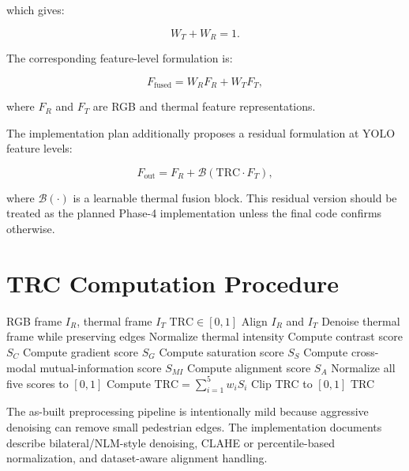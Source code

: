 \documentclass[conference]{IEEEtran}
\begin{document}
which gives:

\begin{equation}
W_T+W_R=1.
\label{eq:weightconstraint}
\end{equation}

The corresponding feature-level formulation is:

\begin{equation}
F_{\mathrm{fused}}
=
W_RF_R+W_TF_T,
\label{eq:fusion}
\end{equation}

where $F_R$ and $F_T$ are RGB and thermal feature representations.

The implementation plan additionally proposes a residual formulation at YOLO feature levels:

\begin{equation}
F_{\mathrm{out}}
=
F_R+\mathcal{B}\left(\mathrm{TRC}\cdot F_T\right),
\label{eq:residual}
\end{equation}

where $\mathcal{B}(\cdot)$ is a learnable thermal fusion block. This residual version should be treated as the planned Phase-4 implementation unless the final code confirms otherwise.


\section{TRC Computation Procedure}

\begin{algorithm}[!t]
\caption{Thermal Reliability Coefficient Computation}
\label{alg:trc}
\begin{algorithmic}[1]
\Require RGB frame $I_R$, thermal frame $I_T$
\Ensure $\mathrm{TRC}\in[0,1]$
\State Align $I_R$ and $I_T$
\State Denoise thermal frame while preserving edges
\State Normalize thermal intensity
\State Compute contrast score $S_C$
\State Compute gradient score $S_G$
\State Compute saturation score $S_S$
\State Compute cross-modal mutual-information score $S_{MI}$
\State Compute alignment score $S_A$
\State Normalize all five scores to $[0,1]$
\State Compute $\mathrm{TRC}=\sum_{i=1}^{5}w_iS_i$
\State Clip TRC to $[0,1]$
\State \Return TRC
\end{algorithmic}
\end{algorithm}

The as-built preprocessing pipeline is intentionally mild because aggressive denoising can remove small pedestrian edges. The implementation documents describe bilateral/NLM-style denoising, CLAHE or percentile-based normalization, and dataset-aware alignment handling.
\end{document}
